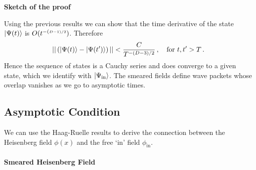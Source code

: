 \noindent
{\bf Sketch of the proof}

\noindent
Using the previous results we can show that the time derivative of the state
$| \Psi(t) \rangle$ is $O(t^{-(\scriptscriptstyle{D-1})/2})$. Therefore 
\begin{equation}
    \label{eq:CauchySeries}
    || \left(| \Psi(t) \rangle - | \Psi(t') \rangle\right) || 
        < \frac{C}{T^{-(D-3)/2}}\, , 
    \quad \mathrm{for}\ t,t'>T\, .
\end{equation}
Hence the sequence of states is a Cauchy series and does converge to a given 
state, which we identify with $| \Psi_\mathrm{in} \rangle$. The smeared fields define 
wave packets whose overlap vanishes as we go to asymptotic times. 

\subsection{Asymptotic Condition}
\label{sec:AsymptCondition}

We can use the Haag-Ruelle results to derive the connection between the Heisenberg 
field $\phi(x)$ and the free `in' field $\phi_\mathrm{in}$. 

\paragraph{Smeared Heisenberg Field}

